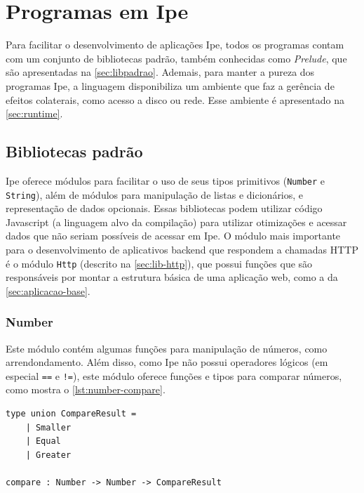 
\chapter{Programas em Ipe}\label{chapter:programas-em-ipe}

Para facilitar o desenvolvimento de aplicações Ipe, todos os programas contam com um conjunto de
bibliotecas padrão, também conhecidas como \textit{Prelude}, que são apresentadas na
\autoref{sec:libpadrao}. Ademais, para manter a pureza dos programas Ipe, a linguagem disponibiliza
um ambiente que faz a gerência de efeitos colaterais, como acesso a disco ou rede. Esse ambiente
é apresentado na \autoref{sec:runtime}.

\section{Bibliotecas padrão}\label{sec:libpadrao}

Ipe oferece módulos para facilitar o uso de seus tipos primitivos (\texttt{Number}
e \texttt{String}), além de módulos para manipulação de listas e dicionários, e
representação de dados opcionais. Essas bibliotecas podem utilizar código Javascript
(a linguagem alvo da compilação) para utilizar otimizações e acessar dados que
não seriam possíveis de acessar em Ipe. O módulo mais importante para o desenvolvimento de
aplicativos backend que respondem a chamadas HTTP é o módulo \texttt{Http} (descrito na
\autoref{sec:lib-http}), que possui funções que são responsáveis por montar a estrutura básica de
uma aplicação web, como a da \autoref{sec:aplicacao-base}.

\subsection{Number}

Este módulo contém algumas funções para manipulação de números, como arrendondamento.
Além disso, como Ipe não possui operadores lógicos (em especial \texttt{==} e \texttt{!=}),
este módulo oferece funções e tipos para comparar números, como mostra o \autoref{lst:number-compare}.

\begin{lstlisting}[label={lst:number-compare},caption={Comparação de números em Ipe}]
type union CompareResult =
    | Smaller
    | Equal
    | Greater

compare : Number -> Number -> CompareResult
\end{lstlisting}

